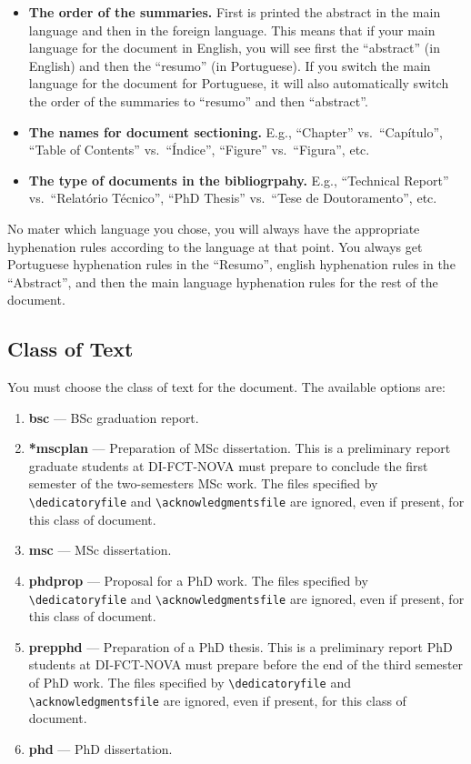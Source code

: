 \begin{itemize}
	\item \textbf{The order of the summaries.} First is printed the abstract in the main language and then in the foreign language. This means that if your main language for the document in English, you will see first the “abstract” (in English) and then the “resumo” (in Portuguese). If you switch the main language for the document for Portuguese, it will also automatically switch the order of the summaries to “resumo” and then “abstract”.
	\item \textbf{The names for document sectioning.} E.g., ``Chapter'' vs.\ ``Capítulo'', ``Table of Contents'' vs.\ ``Índice'', ``Figure'' vs.\ ``Figura'', etc.
	\item \textbf{The type of documents in the bibliogrpahy.} E.g., ``Technical Report'' vs.\ ``Relatório Técnico'', ``PhD Thesis'' vs.\ ``Tese de Doutoramento'', etc.
\end{itemize} 

No mater which language you chose, you will always have the appropriate hyphenation rules according to the language at that point. You always get Portuguese hyphenation rules in the ``Resumo'', english hyphenation rules in the ``Abstract'', and then the main language hyphenation rules for the rest of the document.




\subsection{Class of Text} %
\label{sub:class_of_text}

You must choose the class of text for the document. The available options are:

\begin{enumerate}
	\item \textbf{bsc} --- BSc graduation report.
	\item \textbf{*mscplan} --- Preparation of MSc dissertation. This is a preliminary report graduate students at DI-FCT-NOVA must prepare to conclude the first semester of the two-semesters MSc work. The files specified by \verb!\dedicatoryfile! and \verb!\acknowledgmentsfile! are ignored, even if present, for this class of document.
	\item \textbf{msc} --- MSc dissertation.
	\item \textbf{phdprop} ---  Proposal for a PhD work. The files specified by \verb!\dedicatoryfile! and \verb!\acknowledgmentsfile! are ignored, even if present, for this class of document.
	\item \textbf{prepphd} ---  Preparation of a PhD thesis. This is a preliminary report PhD students at DI-FCT-NOVA must prepare before the end of the third semester of PhD work. The files specified by \verb!\dedicatoryfile! and \verb!\acknowledgmentsfile! are ignored, even if present, for this class of document.
	\item \textbf{phd} --- PhD dissertation.
\end{enumerate}

